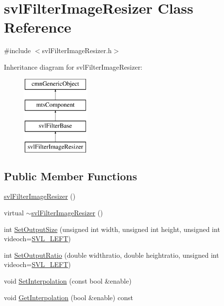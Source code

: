 \hypertarget{classsvl_filter_image_resizer}{\section{svl\-Filter\-Image\-Resizer Class Reference}
\label{classsvl_filter_image_resizer}
}


{\ttfamily \#include $<$svl\-Filter\-Image\-Resizer.\-h$>$}

Inheritance diagram for svl\-Filter\-Image\-Resizer\-:\begin{figure}[H]
\begin{center}
\leavevmode
\includegraphics[height=4.000000cm]{d9/db7/classsvl_filter_image_resizer}
\end{center}
\end{figure}
\subsection*{Public Member Functions}
\begin{DoxyCompactItemize}
\item 
\hyperlink{classsvl_filter_image_resizer_ae3e87effa844cad3c956a8979ba4db14}{svl\-Filter\-Image\-Resizer} ()
\item 
virtual \hyperlink{classsvl_filter_image_resizer_a8c2cf8b7a5042af22fdb5f39dee0198f}{$\sim$svl\-Filter\-Image\-Resizer} ()
\item 
int \hyperlink{classsvl_filter_image_resizer_ac9abd4ff1c22fca8da4f6b7b038672da}{Set\-Output\-Size} (unsigned int width, unsigned int height, unsigned int videoch=\hyperlink{svl_definitions_8h_ab9fec7615f19c8df2919eebcab0b187f}{S\-V\-L\-\_\-\-L\-E\-F\-T})
\item 
int \hyperlink{classsvl_filter_image_resizer_ae2db36bb145652db37193b905f85af13}{Set\-Output\-Ratio} (double widthratio, double heightratio, unsigned int videoch=\hyperlink{svl_definitions_8h_ab9fec7615f19c8df2919eebcab0b187f}{S\-V\-L\-\_\-\-L\-E\-F\-T})
\item 
void \hyperlink{classsvl_filter_image_resizer_aa6146482b63f0bde5db22a68d16a9fbd}{Set\-Interpolation} (const bool \&enable)
\item 
void \hyperlink{classsvl_filter_image_resizer_af2ff2ccfc5360c29a757be470d38b6a3}{Get\-Interpolation} (bool \&enable) const 
\end{DoxyCompactItemize}
